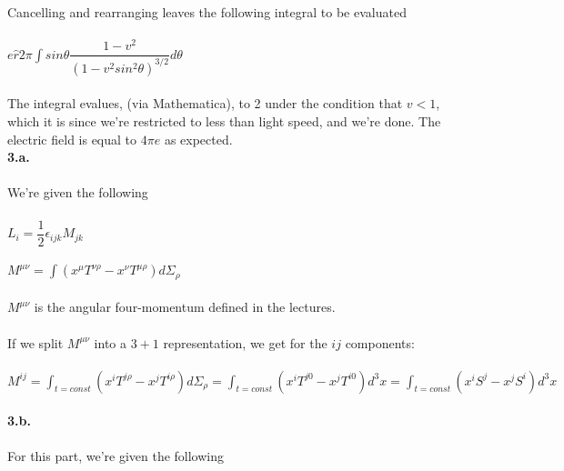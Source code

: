 \documentclass[prb,preprint]
{revtex4-1}
\newcommand{\PRLsep}{\noindent\makebox[\linewidth]{\resizebox{0.8888\linewidth}{2pt}{$\bullet$}}\bigskip}
\begin{document}
\\
\\
Cancelling and rearranging leaves the following integral to be evaluated
\\
\\
$e\hat{r}2 \pi\int sin \theta\dfrac{1-v^2}{\left(1-v^2sin^2\theta\right)^{3/2}} d\theta$
\\
\\
The integral evalues, (via Mathematica), to 2 under the condition that $v < 1$, which it is since we're restricted to less than light speed, and we're done.  The electric field is equal to $4\pi e$ as expected.
\\
\PRLsep
\newpage
\textbf{3.a.}
\\
\\
We're given the following
\\
\\
$L_i = \dfrac{1}{2}\epsilon_{ijk}M_{jk}$
\\
\\
$M^{\mu\nu} = \int \left(x^\mu T^{\nu\rho} - x^\nu T^{\mu\rho}\right)d\Sigma_\rho$
\\
\\
$M^{\mu\nu}$ is the angular four-momentum defined in the lectures.
\\
\\
If we split $M^{\mu\nu}$ into a $3+1$ representation, we get for the $ij$ components:
\\
\\
$M^{ij} = \int_{t=const} \left(x^i T^{j\rho} - x^j T^{i\rho}\right)d\Sigma_\rho = \int_{t=const} \left(x^i T^{j0} - x^j T^{i0}\right)d^3 x =\int_{t=const} \left(x^i S^j - x^j S^i\right)d^3 x$
\\
\\
\PRLsep
\newpage
\textbf{3.b.}
\\
\\
For this part, we're given the following
\\
\\
\\
\PRLsep
\\
\\
\\
\\

\end{document}
